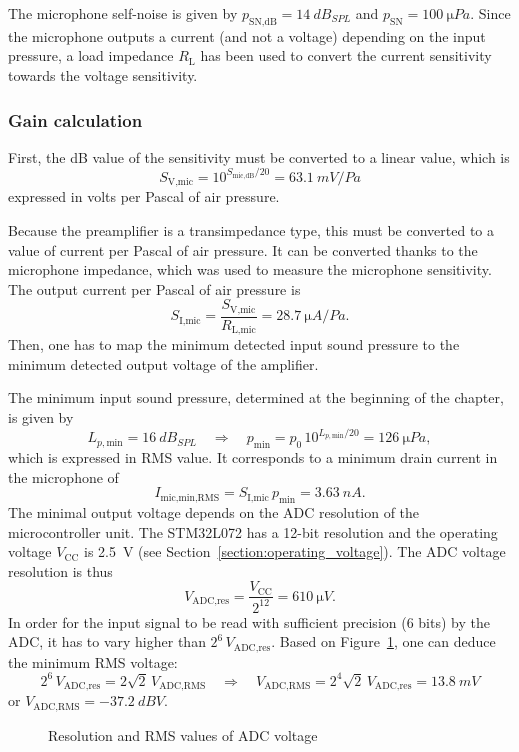 \documentclass{EPL-master-thesis-covers-EN}
\newcommand{\te}[1]{\textrm{#1}}
\begin{document}
The microphone self-noise is given by $p_{\te{SN,dB}} = \SI{14}{dB_{SPL}}$ and $ p_{\te{SN}} = \SI{100}{\micro Pa}$. Since the microphone outputs a current (and not a voltage) depending on the input pressure, a load impedance $R_{\te{L}}$ has been used to convert the current sensitivity towards the voltage sensitivity.

\subsubsection*{Gain calculation}

First, the dB value of the sensitivity must be converted to a linear value, which is
\[
 S_{\te{V,mic}} = 10^{S_{\te{mic,dB}}/20} = \SI{63.1}{mV/Pa}
\]
expressed in volts per Pascal of air pressure.

Because the preamplifier is a transimpedance type, this must be converted to a value of current per Pascal of air pressure. It can be converted thanks to the microphone impedance, which was used to measure the microphone sensitivity. The output current per Pascal of air pressure is
\[
 S_{\te{I,mic}} = \frac{S_{\te{V,mic}}}{R_{\te{L,mic}}} = \SI{28.7}{\micro A/Pa}.
\]
Then, one has to map the minimum detected input sound pressure to the minimum detected output voltage of the amplifier.

The minimum input sound pressure, determined at the beginning of the chapter, is given by
\[
 L_{p,\te{min}} = \SI{16}{dB_{SPL}} \quad \Rightarrow \quad p_\te{min} = p_0 \, 10^{L_{p,\te{min}}/20} = \SI{126}{\micro Pa},
\]
which is expressed in RMS value. It corresponds to a minimum drain current in the microphone of 
\[
 I_{\te{mic,min,RMS}} = S_{\te{I,mic}} \, p_\te{min} = \SI{3.63}{nA}.
\]
The minimal output voltage depends on the ADC resolution of the microcontroller unit. The STM32L072 has a 12-bit resolution and the operating voltage $V_\te{CC}$ is \SI{2.5}{V} (see Section~\ref{section:operating_voltage}). The ADC voltage resolution is thus
\[
 V_{\te{ADC,res}} = \frac{V_\te{CC}}{2^{12}} = \SI{610}{\micro V}.
\]
In order for the input signal to be read with sufficient precision (6 bits) by the ADC, it has to vary higher than $2^6 \,V_{\te{ADC,res}}$. Based on Figure~\ref{fig:ADC_res}, one can deduce the minimum RMS voltage:
\[
 2^6 \, V_{\te{ADC,res}} = 2 \sqrt{2} \, V_\te{ADC,RMS} \quad \Rightarrow \quad V_\te{ADC,RMS} = 2^4 \sqrt{2} \, V_{\te{ADC,res}} = \SI{13.8}{mV}
\]
or $V_{\te{ADC,RMS}} = \SI{-37.2}{dBV}$.

\begin{figure}[H]
\centering
{}
\caption{Resolution and RMS values of ADC voltage}
\label{fig:ADC_res}
\end{figure}
\end{document}
